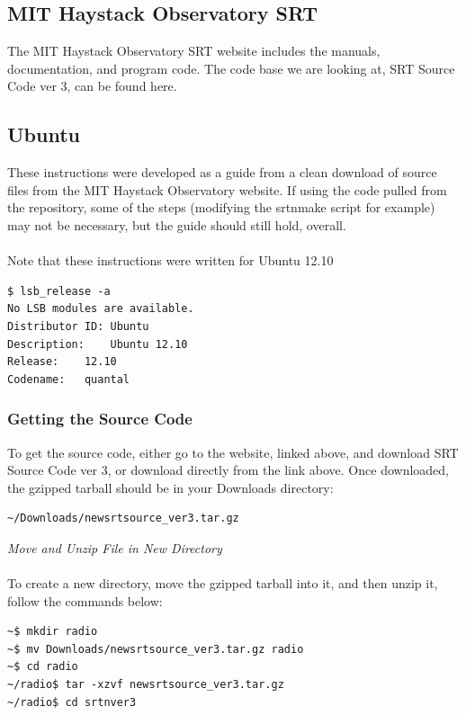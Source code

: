 \documentclass[11pt]{article} %
\begin{document}
\subsection{MIT Haystack Observatory SRT}
The MIT Haystack Observatory SRT website includes the manuals, documentation, and program code. The code base we are looking at, SRT Source Code ver 3, can be found here.

\subsection{Ubuntu}


These instructions were developed as a guide from a clean download of source files from the MIT Haystack Observatory website. If using the code pulled from the repository, some of the steps (modifying the srtnmake script for example) may not be necessary, but the guide should still hold, overall.
\\ \\
Note that these instructions were written for Ubuntu 12.10

\begin{verbatim}
$ lsb_release -a
No LSB modules are available.
Distributor ID: Ubuntu
Description:    Ubuntu 12.10
Release:    12.10
Codename:   quantal
\end{verbatim}



\subsubsection{Getting the Source Code}
To get the source code, either go to the website, linked above, and download SRT Source Code ver 3, or download directly from the link above. Once downloaded, the gzipped tarball should be in your Downloads directory: 
\begin{verbatim}
~/Downloads/newsrtsource_ver3.tar.gz
\end{verbatim}

\noindent\emph{Move and Unzip File in New Directory} 
\\ \\
To create a new directory, move the gzipped tarball into it, and then unzip it, follow the commands below:
\begin{verbatim}
~$ mkdir radio
~$ mv Downloads/newsrtsource_ver3.tar.gz radio
~$ cd radio
~/radio$ tar -xzvf newsrtsource_ver3.tar.gz
~/radio$ cd srtnver3
\end{verbatim}
\end{document}
